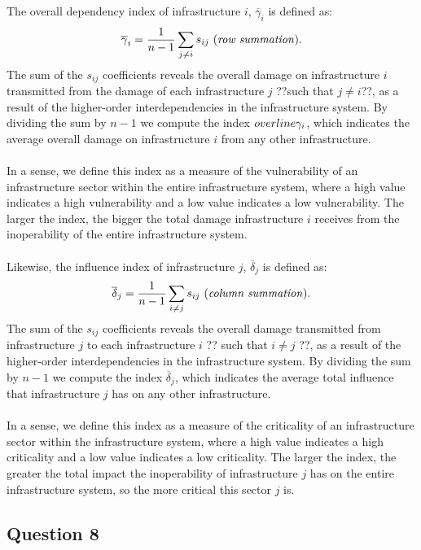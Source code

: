 \documentclass[11pt,a4paper]{article}
\begin{document}
The overall dependency index of infrastructure $i$, $\overline\gamma_i$ is defined as:
\begin{align}
	\overline\gamma_i = \frac{1}{n-1}\sum_{j \neq i} s_{ij} \text{ (\textit{row summation})}.
\end{align}
The sum of the $s_{ij}$ coefficients reveals the overall damage on infrastructure $i$ transmitted from the damage of each infrastructure $j$ ??such that $j \neq i$??, as a result of the higher-order interdependencies in the infrastructure system. By dividing the sum by $n-1$ we compute the index $\\overline\gamma_i$, which indicates the average overall damage on infrastructure $i$ from any other infrastructure. \\
\\
In a sense, we define this index as a measure of the vulnerability of an infrastructure sector within the entire infrastructure system, where a high value indicates a high vulnerability and a low value indicates a low vulnerability. The larger the index, the bigger the total damage infrastructure $i$ receives from the inoperability of the entire infrastructure system.\\
\\
Likewise, the influence index of infrastructure $j$, $\overline\delta_j$ is defined as:
\begin{align}
	\overline\delta_j = \frac{1}{n-1}\sum_{i \neq j} s_{ij} \text{ (\textit{column summation})}.
\end{align}
The sum of the $s_{ij}$ coefficients reveals the overall damage transmitted from infrastructure $j$ to each infrastructure $i$ ?? such that $i \neq j$ ??, as a result of the higher-order interdependencies in the infrastructure system. By dividing the sum by $n-1$ we compute the index $\overline\delta_j$, which indicates the average total influence that infrastructure $j$ has on any other infrastructure.\\
\\
In a sense, we define this index as a measure of the criticality of an infrastructure sector within the infrastructure system, where a high value indicates a high criticality and a low value indicates a low criticality. The larger the index, the greater the total impact the inoperability of infrastructure $j$ has on the entire infrastructure system, so the more critical this sector $j$ is.

\subsection*{Question 8}
\end{document}
